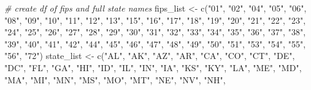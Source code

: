 \documentclass[
]{book}
\newenvironment{Shaded}{\begin{snugshade}}{\end{snugshade}}
\newcommand{\CommentTok}[1]{\textcolor[rgb]{0.56,0.35,0.01}{\textit{#1}}}
\newcommand{\FunctionTok}[1]{\textcolor[rgb]{0.00,0.00,0.00}{#1}}
\newcommand{\NormalTok}[1]{#1}
\newcommand{\OtherTok}[1]{\textcolor[rgb]{0.56,0.35,0.01}{#1}}
\newcommand{\StringTok}[1]{\textcolor[rgb]{0.31,0.60,0.02}{#1}}
\begin{document}
\begin{Shaded}
\begin{Highlighting}[]
\CommentTok{\# create df of fips and full state names}
\NormalTok{fips\_list }\OtherTok{\textless{}{-}} \FunctionTok{c}\NormalTok{(}\StringTok{"01"}\NormalTok{, }\StringTok{"02"}\NormalTok{, }\StringTok{"04"}\NormalTok{, }\StringTok{"05"}\NormalTok{, }\StringTok{"06"}\NormalTok{, }\StringTok{"08"}\NormalTok{, }\StringTok{"09"}\NormalTok{, }\StringTok{"10"}\NormalTok{, }\StringTok{"11"}\NormalTok{, }\StringTok{"12"}\NormalTok{, }
               \StringTok{"13"}\NormalTok{, }\StringTok{"15"}\NormalTok{, }\StringTok{"16"}\NormalTok{, }\StringTok{"17"}\NormalTok{, }\StringTok{"18"}\NormalTok{, }\StringTok{"19"}\NormalTok{, }\StringTok{"20"}\NormalTok{, }\StringTok{"21"}\NormalTok{, }\StringTok{"22"}\NormalTok{, }\StringTok{"23"}\NormalTok{, }
               \StringTok{"24"}\NormalTok{, }\StringTok{"25"}\NormalTok{, }\StringTok{"26"}\NormalTok{, }\StringTok{"27"}\NormalTok{, }\StringTok{"28"}\NormalTok{, }\StringTok{"29"}\NormalTok{, }\StringTok{"30"}\NormalTok{, }\StringTok{"31"}\NormalTok{, }\StringTok{"32"}\NormalTok{, }\StringTok{"33"}\NormalTok{, }
               \StringTok{"34"}\NormalTok{, }\StringTok{"35"}\NormalTok{, }\StringTok{"36"}\NormalTok{, }\StringTok{"37"}\NormalTok{, }\StringTok{"38"}\NormalTok{, }\StringTok{"39"}\NormalTok{, }\StringTok{"40"}\NormalTok{, }\StringTok{"41"}\NormalTok{, }\StringTok{"42"}\NormalTok{, }\StringTok{"44"}\NormalTok{, }
               \StringTok{"45"}\NormalTok{, }\StringTok{"46"}\NormalTok{, }\StringTok{"47"}\NormalTok{, }\StringTok{"48"}\NormalTok{, }\StringTok{"49"}\NormalTok{, }\StringTok{"50"}\NormalTok{, }\StringTok{"51"}\NormalTok{, }\StringTok{"53"}\NormalTok{, }\StringTok{"54"}\NormalTok{, }\StringTok{"55"}\NormalTok{, }
               \StringTok{"56"}\NormalTok{, }\StringTok{"72"}\NormalTok{)}
\NormalTok{state\_list }\OtherTok{\textless{}{-}} \FunctionTok{c}\NormalTok{(}\StringTok{"AL"}\NormalTok{, }\StringTok{"AK"}\NormalTok{, }\StringTok{"AZ"}\NormalTok{, }\StringTok{"AR"}\NormalTok{, }\StringTok{"CA"}\NormalTok{, }\StringTok{"CO"}\NormalTok{, }\StringTok{"CT"}\NormalTok{, }\StringTok{"DE"}\NormalTok{, }\StringTok{"DC"}\NormalTok{, }\StringTok{"FL"}\NormalTok{,}
                \StringTok{"GA"}\NormalTok{, }\StringTok{"HI"}\NormalTok{, }\StringTok{"ID"}\NormalTok{, }\StringTok{"IL"}\NormalTok{, }\StringTok{"IN"}\NormalTok{, }\StringTok{"IA"}\NormalTok{, }\StringTok{"KS"}\NormalTok{, }\StringTok{"KY"}\NormalTok{, }\StringTok{"LA"}\NormalTok{, }\StringTok{"ME"}\NormalTok{,}
                \StringTok{"MD"}\NormalTok{, }\StringTok{"MA"}\NormalTok{, }\StringTok{"MI"}\NormalTok{, }\StringTok{"MN"}\NormalTok{, }\StringTok{"MS"}\NormalTok{, }\StringTok{"MO"}\NormalTok{, }\StringTok{"MT"}\NormalTok{, }\StringTok{"NE"}\NormalTok{, }\StringTok{"NV"}\NormalTok{, }\StringTok{"NH"}\NormalTok{,}

\end{Highlighting}
\end{Shaded}
\end{document}
